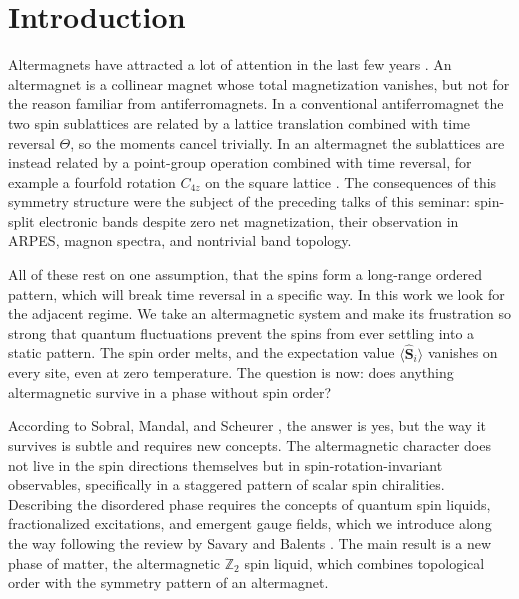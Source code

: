 \documentclass[11pt]{article}
\newcommand{\vS}{\boldsymbol{S}}
\begin{document}
\vspace{2em}

\section{Introduction}
\label{sec:intro}

Altermagnets have attracted a lot of attention in the last few years
\cite{Yuan2020,Smejkal2022,Smejkal2022a}. An altermagnet is a collinear magnet
whose total magnetization vanishes, but not for the reason familiar from
antiferromagnets. In a conventional antiferromagnet the two spin sublattices
are related by a lattice translation combined with time reversal $\Theta$, so
the moments cancel trivially. In an altermagnet the sublattices are instead
related by a point-group operation combined with time reversal, for example a
fourfold rotation $C_{4z}$ on the square lattice \cite{Smejkal2022}. The
consequences of this symmetry structure were the subject of the preceding talks
of this seminar: spin-split electronic bands despite zero net magnetization,
their observation in ARPES, magnon spectra, and nontrivial band topology.

All of these rest on one assumption, that the spins form a long-range
ordered pattern, which will break time reversal in a specific way.
In this work we look for the adjacent regime. We take an altermagnetic system
and make its frustration so strong that quantum fluctuations
prevent the spins from ever settling into a static pattern. The spin order
melts, and the expectation value $\langle \hat{\vS}_i \rangle$ vanishes on
every site, even at zero temperature. The question is now: does anything
altermagnetic survive in a phase without spin order?

According to Sobral, Mandal, and Scheurer \cite{Sobral2025}, the answer is yes,
but the way it survives is subtle and requires new concepts. The altermagnetic
character does not live in the spin directions themselves but in
spin-rotation-invariant observables, specifically in a staggered pattern of
scalar spin chiralities. Describing the disordered phase requires the concepts
of quantum spin liquids, fractionalized excitations, and emergent gauge fields,
which we introduce along the way following the review by Savary and Balents
\cite{Savary2017}. The main result is a new phase of matter, the altermagnetic
$\mathbb{Z}_2$ spin liquid, which combines topological order with the symmetry
pattern of an altermagnet.
\end{document}
